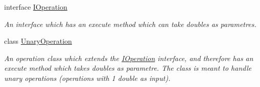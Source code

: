 \begin{DoxyCompactItemize}
\item 
interface \hyperlink{interface_inheritance_r_p_c___project_1_1_i_operation}{I\+Operation}
\begin{DoxyCompactList}\small\item\em An interface which has an execute method which can take doubles as parametres. \end{DoxyCompactList}\item 
class \hyperlink{class_inheritance_r_p_c___project_1_1_unary_operation}{Unary\+Operation}
\begin{DoxyCompactList}\small\item\em An operation class which extends the \hyperlink{interface_inheritance_r_p_c___project_1_1_i_operation}{I\+Operation} interface, and therefore has an execute method which takes doubles as parametre. The class is meant to handle unary operations (operations with 1 double as input). \end{DoxyCompactList}\end{DoxyCompactItemize}
